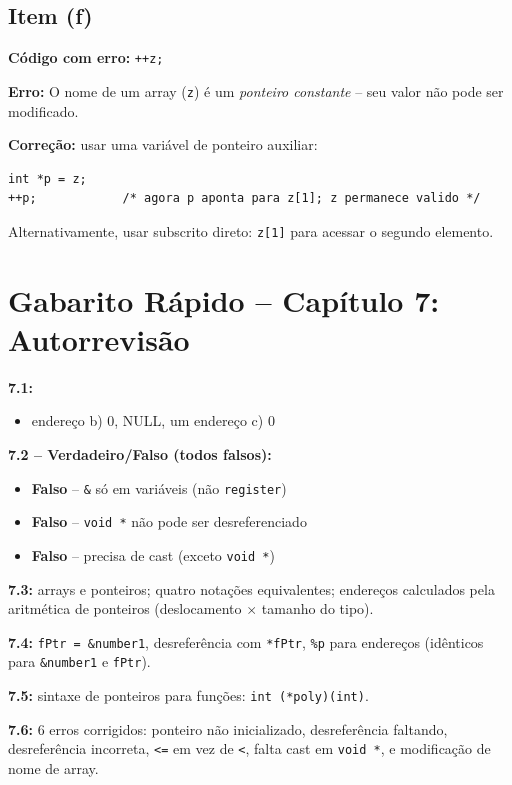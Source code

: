\documentclass[12pt,a4paper]{article}
\begin{document}
\subsection*{Item (f)}
\begin{respostabox}
\textbf{Código com erro:} \texttt{++z;}

\textbf{Erro:} O nome de um array (\texttt{z}) é um \textit{ponteiro constante} --
seu valor não pode ser modificado.

\textbf{Correção:} usar uma variável de ponteiro auxiliar:
\begin{lstlisting}
int *p = z;
++p;            /* agora p aponta para z[1]; z permanece valido */
\end{lstlisting}

Alternativamente, usar subscrito direto: \texttt{z[1]} para acessar o segundo elemento.
\end{respostabox}

\newpage

\section*{Gabarito Rápido -- Capítulo 7: Autorrevisão}

\begin{tcolorbox}[colback=deitellightblue,colframe=deitelblue,title={\bfseries\large Respostas Resumidas}]

\textbf{7.1:}
\begin{itemize}[noitemsep]
  \item[a)] endereço \quad b) 0, NULL, um endereço \quad c) 0
\end{itemize}

\medskip\textbf{7.2 -- Verdadeiro/Falso (todos falsos):}
\begin{itemize}[noitemsep]
  \item[a)] \textcolor{deitelred}{\textbf{Falso}} -- \texttt{\&} só em variáveis (não \texttt{register})
  \item[b)] \textcolor{deitelred}{\textbf{Falso}} -- \texttt{void *} não pode ser desreferenciado
  \item[c)] \textcolor{deitelred}{\textbf{Falso}} -- precisa de cast (exceto \texttt{void *})
\end{itemize}

\medskip\textbf{7.3:} arrays e ponteiros; quatro notações equivalentes;
endereços calculados pela aritmética de ponteiros (deslocamento $\times$ tamanho do tipo).

\medskip\textbf{7.4:} \texttt{fPtr = \&number1}, desreferência com \texttt{*fPtr},
\texttt{\%p} para endereços (idênticos para \texttt{\&number1} e \texttt{fPtr}).

\medskip\textbf{7.5:} sintaxe de ponteiros para funções: \texttt{int (*poly)(int)}.

\medskip\textbf{7.6:} 6 erros corrigidos: ponteiro não inicializado, desreferência
faltando, desreferência incorreta, \texttt{<=} em vez de \texttt{<}, falta cast em
\texttt{void *}, e modificação de nome de array.

\end{tcolorbox}
\end{document}
